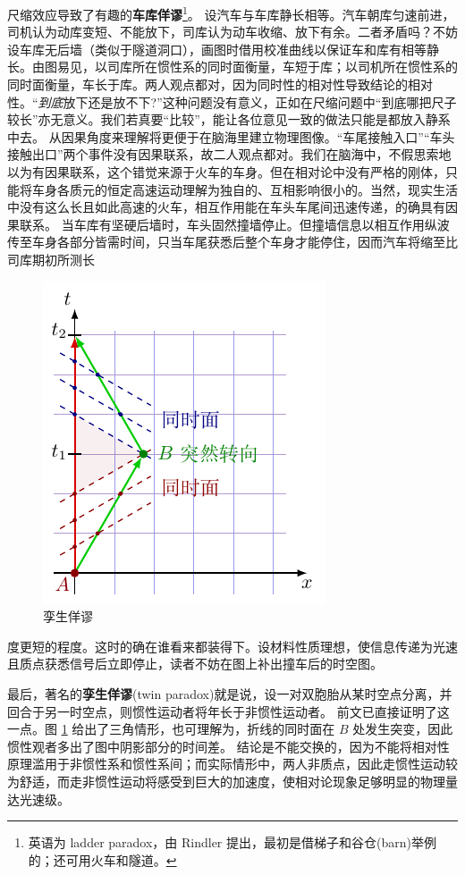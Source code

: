     尺缩效应导致了有趣的\textbf{车库佯谬}\footnote{英语为 ladder paradox，由 Rindler 提出，最初是借梯子和谷仓(barn)举例的；还可用火车和隧道。}。
    设汽车与车库静长相等。汽车朝库匀速前进，司机认为动库变短、不能放下，司库认为动车收缩、放下有余。二者矛盾吗？不妨设车库无后墙（类似于隧道洞口），画图时借用校准曲线以保证车和库有相等静长。由图易见，以司库所在惯性系的同时面衡量，车短于库；以司机所在惯性系的同时面衡量，车长于库。两人观点都对，因为同时性的相对性导致结论的相对性。“\textit{到底}放下还是放不下?”这种问题没有意义，正如在尺缩问题中“到底哪把尺子较长”亦无意义。我们若真要“比较”，能让各位意见一致的做法只能是都放入静系中去。
    从因果角度来理解将更便于在脑海里建立物理图像。“车尾接触入口”“车头接触出口”两个事件没有因果联系，故二人观点都对。我们在脑海中，不假思索地以为有因果联系，这个错觉来源于火车的车身。但在相对论中没有严格的刚体，只能将车身各质元的恒定高速运动理解为独自的、互相影响很小的。当然，现实生活中没有这么长且如此高速的火车，相互作用能在车头车尾间迅速传递，的确具有因果联系。
    当车库有坚硬后墙时，车头固然撞墙停止。但撞墙信息以相互作用纵波传至车身各部分皆需时间，只当车尾获悉后整个车身才能停住，因而汽车将缩至比司库期初所测长
    
    \begin{figure}
        \centering
        \includegraphics[width=.35\textwidth]{fig/chpt01/TWIN PARADOX.pdf}
        \caption{孪生佯谬}
        \label{fig:twin}
    \end{figure}

    \noindent 度更短的程度。这时的确在谁看来都装得下。设材料性质理想，使信息传递为光速且质点获悉信号后立即停止，读者不妨在图上补出撞车后的时空图。

    最后，著名的\textbf{孪生佯谬}(twin paradox)就是说，设一对双胞胎从某时空点分离，并回合于另一时空点，则惯性运动者将年长于非惯性运动者。
    前文已直接证明了这一点。图 \ref{fig:twin} 给出了三角情形，也可理解为，折线的同时面在 $B$ 处发生突变，因此惯性观者多出了图中阴影部分的时间差。
    结论是不能交换的，因为不能将相对性原理滥用于非惯性系和惯性系间；而实际情形中，两人非质点，因此走惯性运动较为舒适，而走非惯性运动将感受到巨大的加速度，使相对论现象足够明显的物理量达光速级。

